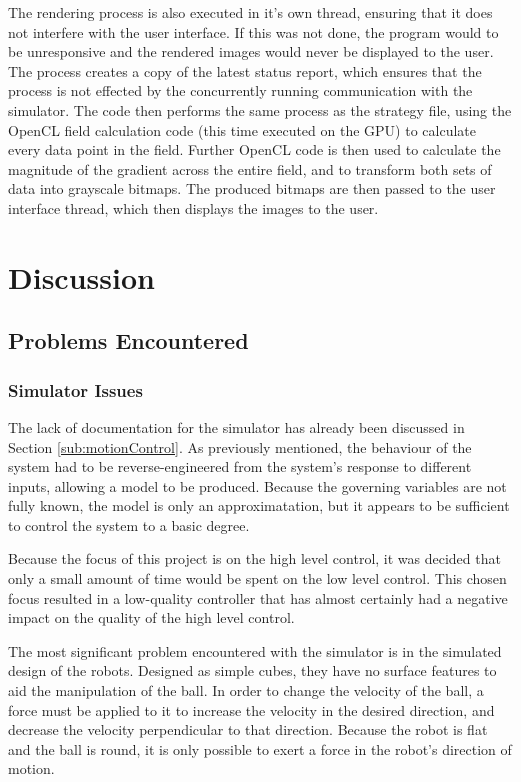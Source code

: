 \documentclass[10pt]{article}
\begin{document}
The rendering process is also executed in it's own thread, ensuring that it does
not interfere with the user interface. If this was not done, the program would
to be unresponsive and the rendered images would never be displayed to the user.
The process creates a copy of the latest status report, which ensures that the
process is not effected by the concurrently running communication with the
simulator. The code then performs the same process as the strategy file, using
the OpenCL field calculation code (this time executed on the GPU) to
calculate every data point in the field. Further OpenCL code is then used to
calculate the magnitude of the gradient across the entire field, and to
transform both sets of data into grayscale bitmaps. The produced bitmaps are
then passed to the user interface thread, which then displays the images to the
user.

\section{Discussion}

\subsection{Problems Encountered} 

\subsubsection{Simulator Issues\label{sub:simulatorIssues}}

The lack of documentation for the simulator has already been discussed in
Section \ref{sub:motionControl}.  As previously mentioned, the behaviour of the
system had to be reverse-engineered from the system's response to different
inputs, allowing a model to be produced.  Because the governing variables are
not fully known, the model is only an approximatation, but it appears to be
sufficient to control the system to a basic degree.

Because the focus of this project is on the high level control, it was decided
that only a small amount of time would be spent on the low level control.  This
chosen focus resulted in a low-quality controller that has almost certainly had
a negative impact on the quality of the high level control.

The most significant problem encountered with the simulator is in the simulated
design of the robots.  Designed as simple cubes, they have no surface features
to aid the manipulation of the ball.  In order to change the velocity of the
ball, a force must be applied to it to increase the velocity in the desired
direction, and decrease the velocity perpendicular to that direction.  Because
the robot is flat and the ball is round, it is only possible to exert a force in
the robot's direction of motion.
\end{document}
